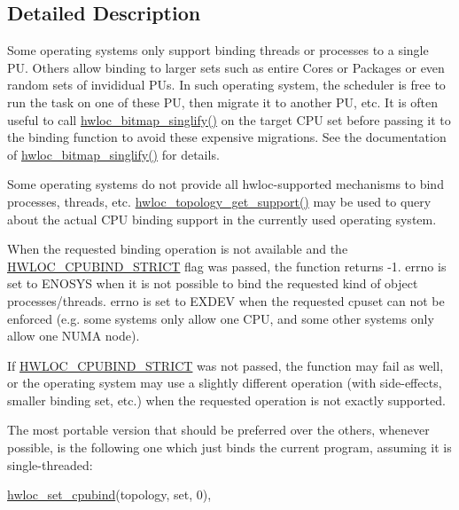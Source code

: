 \subsection{Detailed Description}
Some operating systems only support binding threads or processes to a single PU. Others allow binding to larger sets such as entire Cores or Packages or even random sets of invididual P\+Us. In such operating system, the scheduler is free to run the task on one of these PU, then migrate it to another PU, etc. It is often useful to call \hyperlink{a00205_gaa611a77c092e679246afdf9a60d5db8b}{hwloc\+\_\+bitmap\+\_\+singlify()} on the target C\+PU set before passing it to the binding function to avoid these expensive migrations. See the documentation of \hyperlink{a00205_gaa611a77c092e679246afdf9a60d5db8b}{hwloc\+\_\+bitmap\+\_\+singlify()} for details.

Some operating systems do not provide all hwloc-\/supported mechanisms to bind processes, threads, etc. \hyperlink{a00193_gab8c76173c4a8ce1a9a9366012b1388e6}{hwloc\+\_\+topology\+\_\+get\+\_\+support()} may be used to query about the actual C\+PU binding support in the currently used operating system.

When the requested binding operation is not available and the \hyperlink{a00190_gga217dc8d373f8958cc93c154ebce1c71ca679a7e0f0c7ee06b123565f90d98e7fa}{H\+W\+L\+O\+C\+\_\+\+C\+P\+U\+B\+I\+N\+D\+\_\+\+S\+T\+R\+I\+CT} flag was passed, the function returns -\/1. {\ttfamily errno} is set to {\ttfamily E\+N\+O\+S\+YS} when it is not possible to bind the requested kind of object processes/threads. errno is set to {\ttfamily E\+X\+D\+EV} when the requested cpuset can not be enforced (e.\+g. some systems only allow one C\+PU, and some other systems only allow one N\+U\+MA node).

If \hyperlink{a00190_gga217dc8d373f8958cc93c154ebce1c71ca679a7e0f0c7ee06b123565f90d98e7fa}{H\+W\+L\+O\+C\+\_\+\+C\+P\+U\+B\+I\+N\+D\+\_\+\+S\+T\+R\+I\+CT} was not passed, the function may fail as well, or the operating system may use a slightly different operation (with side-\/effects, smaller binding set, etc.) when the requested operation is not exactly supported.

The most portable version that should be preferred over the others, whenever possible, is the following one which just binds the current program, assuming it is single-\/threaded\+:


\begin{DoxyCode}
\hyperlink{a00190_ga80bc07473a8edf840cae17bd7ec21d48}{hwloc\_set\_cpubind}(topology, \textcolor{keyword}{set}, 0),
\end{DoxyCode}


